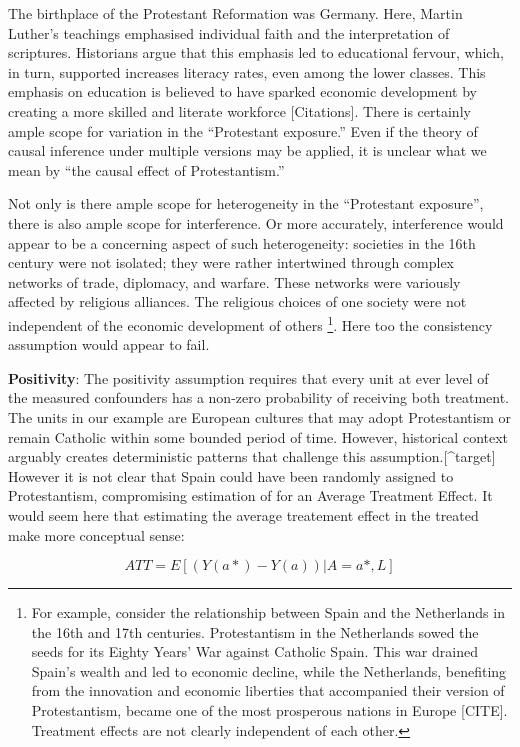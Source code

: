 \documentclass[
  singlecolumn]{report}
\begin{document}
The birthplace of the Protestant Reformation was Germany. Here, Martin
Luther's teachings emphasised individual faith and the interpretation of
scriptures. Historians argue that this emphasis led to educational
fervour, which, in turn, supported increases literacy rates, even among
the lower classes. This emphasis on education is believed to have
sparked economic development by creating a more skilled and literate
workforce {[}Citations{]}. There is certainly ample scope for variation
in the ``Protestant exposure.'' Even if the theory of causal inference
under multiple versions may be applied, it is unclear what we mean by
``the causal effect of Protestantism.''

Not only is there ample scope for heterogeneity in the ``Protestant
exposure'', there is also ample scope for interference. Or more
accurately, interference would appear to be a concerning aspect of such
heterogeneity: societies in the 16th century were not isolated; they
were rather intertwined through complex networks of trade, diplomacy,
and warfare. These networks were variously affected by religious
alliances. The religious choices of one society were not independent of
the economic development of others \footnote{For example, consider the
  relationship between Spain and the Netherlands in the 16th and 17th
  centuries. Protestantism in the Netherlands sowed the seeds for its
  Eighty Years' War against Catholic Spain. This war drained Spain's
  wealth and led to economic decline, while the Netherlands, benefiting
  from the innovation and economic liberties that accompanied their
  version of Protestantism, became one of the most prosperous nations in
  Europe {[}CITE{]}. Treatment effects are not clearly independent of
  each other.}. Here too the consistency assumption would appear to
fail.

\textbf{Positivity}: The positivity assumption requires that every unit
at ever level of the measured confounders has a non-zero probability of
receiving both treatment. The units in our example are European cultures
that may adopt Protestantism or remain Catholic within some bounded
period of time. However, historical context arguably creates
deterministic patterns that challenge this assumption.{[}\^{}target{]}
However it is not clear that Spain could have been randomly assigned to
Protestantism, compromising estimation of for an Average Treatment
Effect. It would seem here that estimating the average treatement effect
in the treated make more conceptual sense:

\[ATT = E[(Y(a*)- Y(a))|A = a*,L]\]
\end{document}
